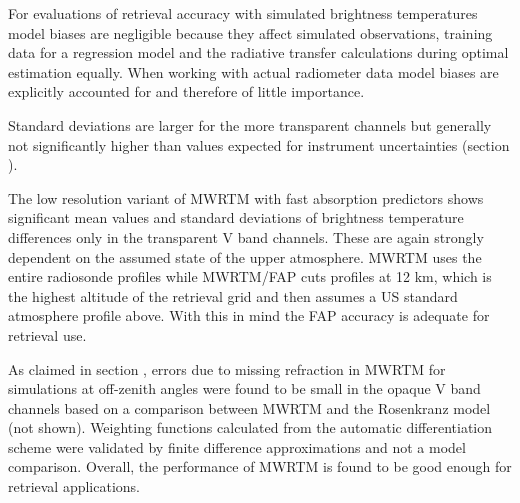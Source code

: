     For evaluations of retrieval accuracy with simulated brightness
    temperatures model biases are negligible because they affect simulated
    observations, training data for a regression model and the radiative
    transfer calculations during optimal estimation equally. When working with
    actual radiometer data model biases are explicitly accounted for and
    therefore of little importance.
    
    Standard deviations are larger for the more transparent channels but
    generally not significantly higher than values expected for instrument
    uncertainties (section ).

    The low resolution variant of MWRTM with fast absorption predictors shows
    significant mean values and standard deviations of brightness temperature
    differences only in the transparent V band channels. These are again
    strongly dependent on the assumed state of the upper atmosphere. MWRTM uses
    the entire radiosonde profiles while MWRTM/FAP cuts profiles at 12 km,
    which is the highest altitude of the retrieval grid and then assumes a
    US standard atmosphere profile above. With this in mind the FAP accuracy
    is adequate for retrieval use.

    As claimed in section , errors due to missing
    refraction in MWRTM for simulations at off-zenith angles were found to be
    small in the opaque V band channels based on a comparison between MWRTM and
    the Rosenkranz model (not shown). Weighting functions calculated from the
    automatic differentiation scheme were validated by finite difference
    approximations and not a model comparison. Overall, the performance of
    MWRTM is found to be good enough for retrieval applications.

\stopsubsection

\stopsection


